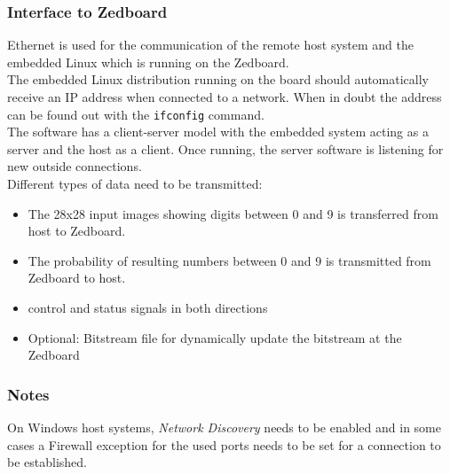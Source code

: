 \subsubsection{Interface to Zedboard} \label{subsec:InterfaceRemoteZed}
Ethernet is used for the communication of the remote host system and the embedded Linux which is running on the Zedboard.\\ 
The embedded Linux distribution running on the board should automatically receive an IP address when connected to a network. When in doubt the address can be found out with the \verb|ifconfig| command. \\
The software has a client-server model with the embedded system acting as a server and the host as a client. Once running, the server software is listening for new outside connections.\\ 
Different types of data need to be transmitted:
\begin{itemize}
	\item The 28x28 input images showing digits between 0 and 9 is transferred from host to Zedboard.
	\item The probability of resulting numbers between 0 and 9 is transmitted from Zedboard to host.
	\item control and status signals in both directions 
	\item Optional: Bitstream file for dynamically update the bitstream at the Zedboard
\end{itemize}
\subsubsection{Notes}
On Windows host systems, \emph{Network Discovery} needs to be enabled and in some cases a Firewall exception for the used ports needs to be set for a connection to be established. \\